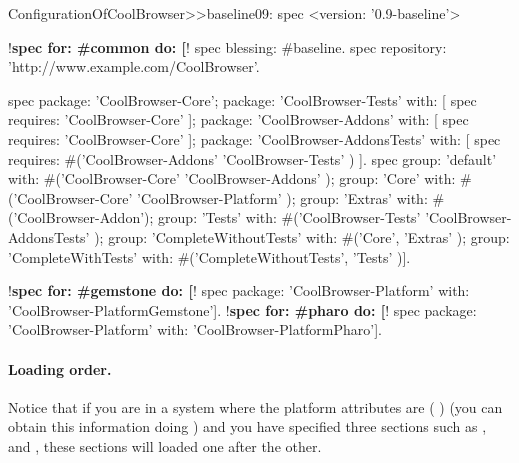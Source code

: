 \documentclass[a4paper,10pt,twoside]{book}
\begin{document}
\begin{code}{}
ConfigurationOfCoolBrowser>>baseline09: spec 
      <version: '0.9-baseline'>
      
      !\textbf{spec for: \#common do: [}!
            spec blessing: #baseline.
            spec repository: 'http://www.example.com/CoolBrowser'.
            
            spec 
                  package: 'CoolBrowser-Core';
                  package: 'CoolBrowser-Tests' with: [ spec requires: 'CoolBrowser-Core' ];
                  package: 'CoolBrowser-Addons' with: [ spec requires: 'CoolBrowser-Core' ];
                  package: 'CoolBrowser-AddonsTests' with: [ 
                        spec requires: #('CoolBrowser-Addons' 'CoolBrowser-Tests' ) ].
            spec 
                  group: 'default' with: #('CoolBrowser-Core' 'CoolBrowser-Addons' );
                  group: 'Core' with: #('CoolBrowser-Core' 'CoolBrowser-Platform' );
                  group: 'Extras' with: #('CoolBrowser-Addon');
                  group: 'Tests' with: #('CoolBrowser-Tests' 'CoolBrowser-AddonsTests' );
                  group: 'CompleteWithoutTests' with: #('Core', 'Extras' );
                  group: 'CompleteWithTests' with: #('CompleteWithoutTests', 'Tests' )].
                  
      !\textbf{spec for: \#gemstone do: [}!
            spec package: 'CoolBrowser-Platform' with: 'CoolBrowser-PlatformGemstone'].
      !\textbf{spec for: \#pharo do: [}!
            spec package: 'CoolBrowser-Platform' with: 'CoolBrowser-PlatformPharo'].
\end{code}



\paragraph{Loading order.}
Notice that if you are
in a system where the platform attributes are (    ) (you can obtain this information doing ) and you have specified three sections such as ,  and , these sections will loaded one after the other.
\end{document}
